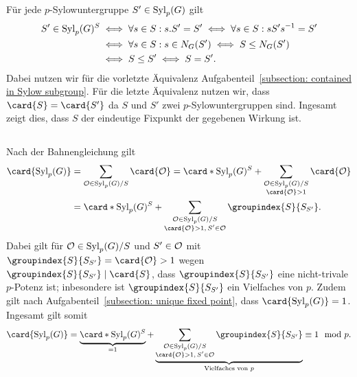 Für jede $p$-Sylowuntergruppe $S' \in \Sylow{p}{G}$ gilt
\begin{align*}
        S' \in \Sylow{p}{G}^S
  &\iff \forall s \in S: s.S' = S'
   \iff \forall s \in S: s S' s^{-1} = S'
  \\
  &\iff \forall s \in S: s \in \normalizer{S'}{G}
   \iff S \subgroup \normalizer{S'}{G}
  \\
  &\iff S \subgroup S'
   \iff S = S'.
\end{align*}
Dabei nutzen wir für die vorletzte Äquivalenz Aufgabenteil~\ref{subsection: contained in Sylow subgroup}.
Für die letzte Äquivalenz nutzen wir, dass $\card{S} = \card{S'}$ da $S$ und $S'$ zwei $p$-Sylowuntergruppen sind.
Ingesamt zeigt dies, dass $S$ der eindeutige Fixpunkt der gegebenen Wirkung ist.





\subsection{}

Nach der Bahnengleichung gilt
\begin{align*}
      \card{\Sylow{p}{G}}
  &=  \sum_{\orbit \in \Sylow{p}{G}/S} \card{\orbit}
   =    \card*{\Sylow{p}{G}^S}
      + \sum_{\substack{\orbit \in \Sylow{p}{G}/S \\ \card{\orbit} > 1}}
        \card{\orbit}
  \\
  &=    \card*{\Sylow{p}{G}^S}
      + \sum_{\substack{\orbit \in \Sylow{p}{G}/S \\ \card{\orbit} > 1, \, S' \in \orbit}}
        \groupindex{S}{S_{S'}}.
\end{align*}
Dabei gilt für $\orbit \in \Sylow{p}{G}/S$ und $S' \in \orbit$ mit $\groupindex{S}{S_{S'}} = \card{\orbit} > 1$ wegen $\groupindex{S}{S_{S'}} \divides \card{S}$, dass $\groupindex{S}{S_{S'}}$ eine nicht-trivale $p$-Potenz ist;
inbesondere ist $\groupindex{S}{S_{S'}}$ ein Vielfaches von $p$.
Zudem gilt nach Aufgabenteil~\ref{subsection: unique fixed point}, dass $\card{\Sylow{p}{G}} = 1$.
Ingesamt gilt somit
\[
          \card{\Sylow{p}{G}}
  =       \underbrace{ \card*{\Sylow{p}{G}^S} }_{=1}
          + \underbrace{
            \sum_{\substack{\orbit \in \Sylow{p}{G}/S \\ \card{\orbit} > 1, \, S' \in \orbit}}
            \groupindex{S}{S_{S'}}
            }_{\text{Vielfaches von $p$}}
  \equiv  1
  \mod    p.
\]





